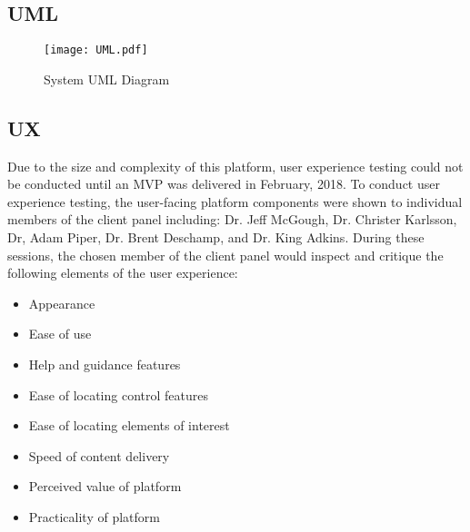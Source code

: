 \subsection{UML}
 
	\begin{figure}[H]
	 	\centering
		\texttt{[image: UML.pdf]}
		\caption{System UML Diagram} 
	 	\label{fig:SystemUML}	
	\end{figure}
    
\subsection{UX}

Due to the size and complexity of this platform, user experience testing could not be conducted until an MVP was delivered in February, 2018. To conduct user experience testing, the user-facing platform components were shown to individual members of the client panel including: Dr. Jeff McGough, Dr. Christer Karlsson, Dr, Adam Piper, Dr. Brent Deschamp, and Dr. King Adkins. During these sessions, the chosen member of the client panel would inspect and critique the following elements of the user experience:

\begin{itemize}
	\item Appearance
	\item Ease of use
	\item Help and guidance features
    \item Ease of locating control features 
    \item Ease of locating elements of interest
    \item Speed of content delivery 
    \item Perceived value of platform
    \item Practicality of platform  
\end{itemize}




